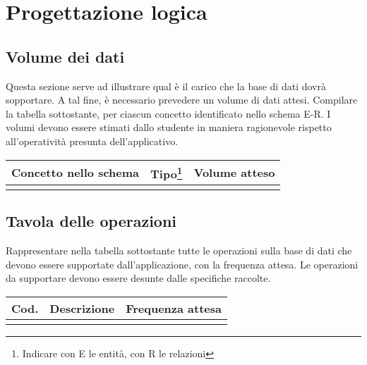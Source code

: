 \section{Progettazione logica}

\subsection*{Volume dei dati}

\begin{templateblock}
    Questa sezione serve ad illustrare qual è il carico che la base di dati
    dovrà sopportare.
    A tal fine, è necessario prevedere un volume di dati attesi.
    Compilare la tabella sottostante, per ciascun concetto identificato nello
    schema E-R. I volumi devono essere stimati dallo studente in maniera
    ragionevole rispetto all’operatività presunta dell’applicativo.
\end{templateblock}

\begin{tabularx}{\linewidth}{|Y|c|Y|}
    \hline
    \textbf{Concetto nello schema} & \textbf{Tipo}\footnote{Indicare con E le entità, con R le relazioni} & \textbf{Volume atteso} \\\hline
                                   &                                                                      &                        \\ \hline
\end{tabularx}

\subsection*{Tavola delle operazioni}

\begin{templateblock}
    Rappresentare nella tabella sottostante tutte le operazioni sulla base
    di dati che devono essere supportate dall’applicazione, con la
    frequenza attesa.
    Le operazioni da supportare devono essere desunte dalle specifiche raccolte.
\end{templateblock}

\begin{tabularx}{\linewidth}{|c|Y|Y|}
    \hline
    \textbf{Cod.} & \textbf{Descrizione} & \textbf{Frequenza attesa} \\\hline
                  &                      &                           \\ \hline
\end{tabularx}

